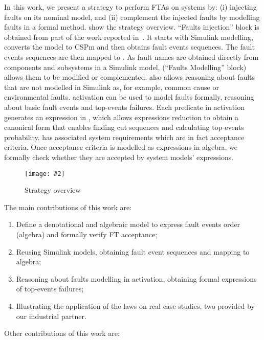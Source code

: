 \documentclass[en,twoside,onehalfspacing,phd]{risethesis}
\newcommand{\includegraphicsaspectratio}[2][1]{%
  \texttt{[image: \#2]}%
}
\newcommand{\simulink}{Simulink\xspace}
\begin{document}
In this work, we present a strategy to perform \aclp{FTA} on systems by: (i) injecting faults on its nominal model, and (ii) complement the injected faults by modelling faults in a formal method.
 show the strategy overview.
``Faults injection'' block is obtained from part of the work reported in~\cite{Didier2012}.
It starts with \simulink modelling, converts the model to \ac{CSPm} and then obtains fault events sequences.
The fault events sequences are then mapped to .
As fault names are obtained directly from components and subsystems in a Simulink model,  (``Faults Modelling'' block) allows them to be modified or complemented.
 also allows reasoning about faults that are not modelled in Simulink as, for example, common cause or environmental faults.
\Ac{activation} can be used to model faults formally, reasoning about basic fault events and top-events failures.
Each predicate in \ac{activation} generates an expression in , which allows expressions reduction to obtain a canonical form that enables finding cut sequences and calculating top-events probability.
 has associated system requirements which are in fact acceptance criteria.
Once  acceptance criteria is modelled as expressions in \ac{algebra}, we formally check whether they are accepted by system models' expressions.

\begin{figure}[t]
  \centering
  \includegraphicsaspectratio[0.8]{StrategyOverview}
  \caption{Strategy overview}
  \label{fig:strategy-overview}
\end{figure}

The main contributions of this work are:

\begin{enumerate}
  \item Define a denotational and algebraic model to express fault events order (\ac{algebra}) and formally verify \ac{FT} acceptance;
  \item Reusing \simulink models, obtaining fault event sequences and mapping to \ac{algebra};
  \item Reasoning about faults modelling in \ac{activation}, obtaining formal expressions of top-events failures;
  \item Illustrating the application of the laws on real case studies, two provided by our industrial partner.
\end{enumerate}

Other contributions of this work are:
\end{document}
